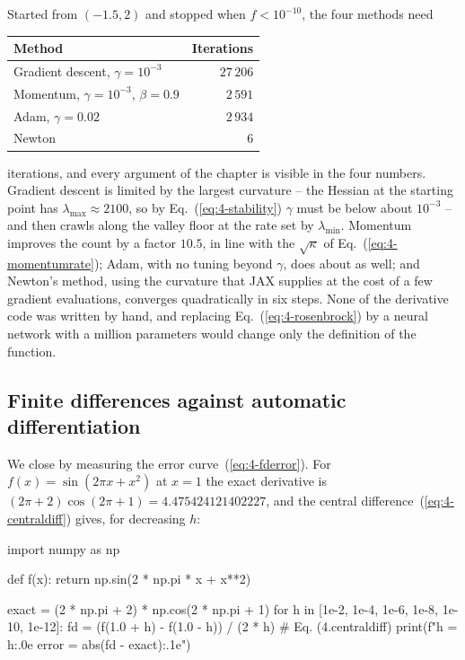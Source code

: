 Started from $(-1.5,2)$ and stopped when $f<10^{-10}$, the four methods need
\begin{center}
\renewcommand{\arraystretch}{1.2}
\begin{tabular}{lr}
\toprule
\textbf{Method} & \textbf{Iterations}\\
\midrule
Gradient descent, $\gamma=10^{-3}$ & $27\,206$\\
Momentum, $\gamma=10^{-3}$, $\beta=0.9$ & $2\,591$\\
Adam, $\gamma=0.02$ & $2\,934$\\
Newton & $6$\\
\bottomrule
\end{tabular}
\end{center}
iterations, and every argument of the chapter is visible in the four numbers.
Gradient descent is limited by the largest curvature -- the Hessian at the
starting point has $\lambda_{\max}\approx2100$, so by
Eq.~(\ref{eq:4-stability}) $\gamma$ must be below about $10^{-3}$ -- and then
crawls along the valley floor at the rate set by $\lambda_{\min}$.  Momentum
improves the count by a factor $10.5$, in line with the $\sqrt{\kappa}$ of
Eq.~(\ref{eq:4-momentumrate}); Adam, with no tuning beyond $\gamma$, does about
as well; and Newton's method, using the curvature that JAX supplies at the
cost of a few gradient evaluations, converges quadratically in six steps.
None of the derivative code was written by hand, and replacing
Eq.~(\ref{eq:4-rosenbrock}) by a neural network with a million parameters
would change only the definition of the function.

\subsection{Finite differences against automatic differentiation}
\label{sec:adfdcheck}

We close by measuring the error curve~(\ref{eq:4-fderror}).  For
$f(x)=\sin(2\pi x+x^{2})$ at $x=1$ the exact derivative is
$(2\pi+2)\cos(2\pi+1)=4.475424121402227$, and the central
difference~(\ref{eq:4-centraldiff}) gives, for decreasing $h$:

\begin{Python}{}
import numpy as np

def f(x):
    return np.sin(2 * np.pi * x + x**2)

exact = (2 * np.pi + 2) * np.cos(2 * np.pi + 1)
for h in [1e-2, 1e-4, 1e-6, 1e-8, 1e-10, 1e-12]:
    fd = (f(1.0 + h) - f(1.0 - h)) / (2 * h)       # Eq. (4.centraldiff)
    print(f"h = {h:.0e}   error = {abs(fd - exact):.1e}")
\end{Python}

